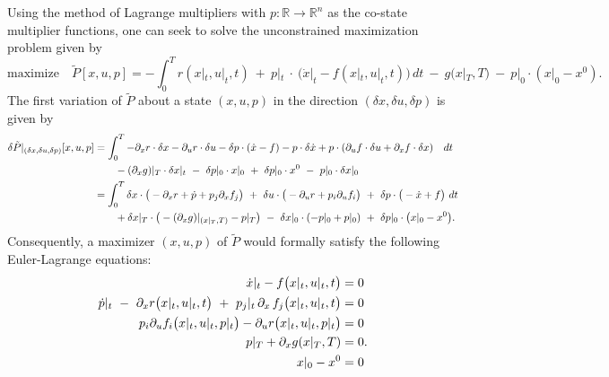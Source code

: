 \documentclass[11pt]{article}
\newcommand{\R}{\mathbb R}
\newcommand{\p}{\partial}
\begin{document}
Using the method of Lagrange multipliers with $p:\R \to \R^n$ as the co-state multiplier functions, one can seek to solve the unconstrained maximization problem given by
\begin{equation*}
    \mbox{maximize} \quad \tilde{P}[x,u,p] = - \int_0^T r\left(x|_t,u|_t,t \right) \ + \ p|_t \ \cdot \ \big(\dot{x}|_t - f(x|_t,u|_t,t) \big) \, dt \ - \ g(x|_T, T) \ - \ p|_0 \cdot (x|_0 - x^0).
\end{equation*}
The first variation of $\tilde{P}$ about a state $(x,u,p)$ in the direction $(\delta x, \delta u, \delta p)$ is given by
\begin{subequations}
\allowdisplaybreaks
\begin{align}
    \delta \tilde{P}|_{(\delta x, \delta u, \delta p)}[x,u,p] & = \int_0^T - \p_x r \cdot \delta x - \p_u r \cdot \delta u - \delta p \cdot (\dot{x} - f) - p \cdot \delta \dot{x} + p \cdot (\p_u f \cdot \delta u + \p_x f \cdot \delta x) \quad dt \notag\\
    & \qquad - (\p_x g)|_T \cdot \delta x|_t \ - \ \delta p|_0 \cdot x|_0  \ +  \ \delta p|_0 \cdot x^0 \ - \ p|_0 \cdot \delta x|_0 \notag\\
    & = \int_0^T \delta x \cdot \big(  - \p_x r + \dot{p} + p_j \p_x f_j \big) \ + \ \delta u \cdot \big(  - \p_u r + p_i \p_u f_i \big) \ + \ \delta p \cdot \big( - \dot{x} + f \big) \ dt   \notag\\
    & \qquad + \delta x|_T \cdot \big( - (\p_x g)|_{(x|_T,T)} - p|_T \big) \  - \ \delta x|_0 \cdot (-p|_0 + p|_0) \ + \ \delta p|_0 \cdot \big( x|_0 - x^0 \big). \notag
\end{align}
\end{subequations}
Consequently, a maximizer $(x,u,p)$ of $\tilde{P}$ would formally satisfy the following Euler-Lagrange equations:
\begin{subequations}\label{eq:control_EL}
\allowdisplaybreaks
    \begin{align}
        \dot{x}|_t - f\big(x|_t,u|_t, t\big) & = 0 \label{eq:x_evol}\\
        \dot{p}|_t \ -  \ \p_x r\big(x|_t,u|_t,t \big) \ + \ p_j|_t \, \p_x \, f_j \big(x|_t,u|_t,t\big) & = 0 \label{eq:p_evol}\\ 
        p_i \p_u f_i \big(x|_t,u|_t,p|_t\big) - \p_u r \big(x|_t,u|_t,p|_t \big) & = 0 \label{eq:H_crit}\\
        p|_T + \p_x g(x|_T,T) & = 0. \label{eq:p_bc}\\
        x|_0 -  x^0 & = 0 \label{eq:x_bc}
    \end{align}   
\end{subequations}
\end{document}

